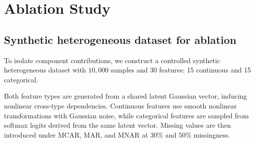 \documentclass[times, review, 10pt]{elsarticle}
\newcommand{\DIFaddbegin}{\begingroup\color{blue}}
\newcommand{\DIFaddend}{\endgroup}
\begin{document}
\section{Ablation Study}


\subsection{Synthetic heterogeneous dataset for ablation}

\DIFaddbegin
To isolate component contributions, we construct a controlled synthetic
heterogeneous dataset with $10{,}000$ samples and 30 features: 15 continuous
and 15 categorical.
\DIFaddend

\DIFaddbegin
Both feature types are generated from a shared latent Gaussian vector, inducing
nonlinear cross-type dependencies. Continuous features use smooth nonlinear
transformations with Gaussian noise, while categorical features are sampled
from softmax logits derived from the same latent vector. Missing values are
then introduced under MCAR, MAR, and MNAR at 30\% and 50\% missingness.
\DIFaddend






\end{document}

